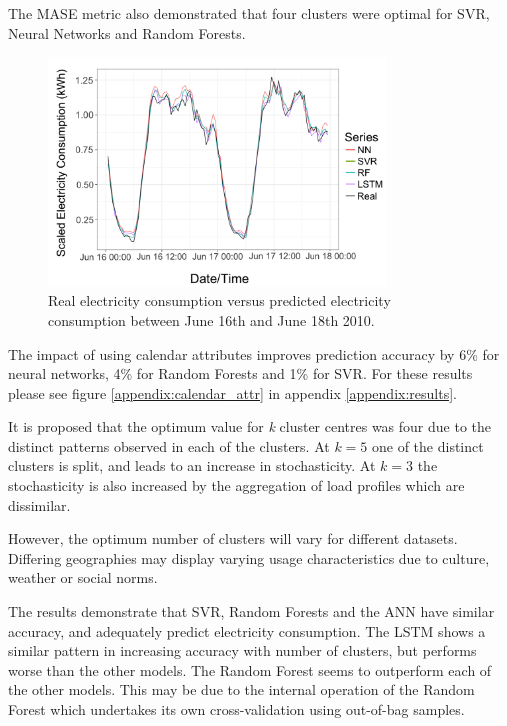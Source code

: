 The MASE metric also demonstrated that four clusters were optimal for SVR, Neural Networks and Random Forests.

\begin{figure}
	\includegraphics[width=0.8\textwidth]{Chapter5/figures/actual_vs_predicted_enlarged.png}
	\caption{Real electricity consumption versus predicted electricity consumption between June 16th and June 18th 2010.}
	\label{fig:act_vs_pred}
\end{figure}

The impact of using calendar attributes improves prediction accuracy by 6\% for neural networks, 4\% for Random Forests and 1\% for SVR. For these results please see figure \ref{appendix:calendar_attr} in appendix \ref{appendix:results}.

It is proposed that the optimum value for \textit{k} cluster centres was four due to the distinct patterns observed in each of the clusters. At $k=5$ one of the distinct clusters is split, and leads to an increase in stochasticity. At $k=3$ the stochasticity is also increased by the aggregation of load profiles which are dissimilar. %

However, the optimum number of clusters will vary for different datasets. Differing geographies may display varying usage characteristics due to culture, weather or social norms.

The results demonstrate that SVR, Random Forests and the ANN have similar accuracy, and adequately predict electricity consumption. The LSTM shows a similar pattern in increasing accuracy with number of clusters, but performs worse than the other models. The Random Forest seems to outperform each of the other models. This may be due to the internal operation of the Random Forest which undertakes its own cross-validation using out-of-bag samples. 

